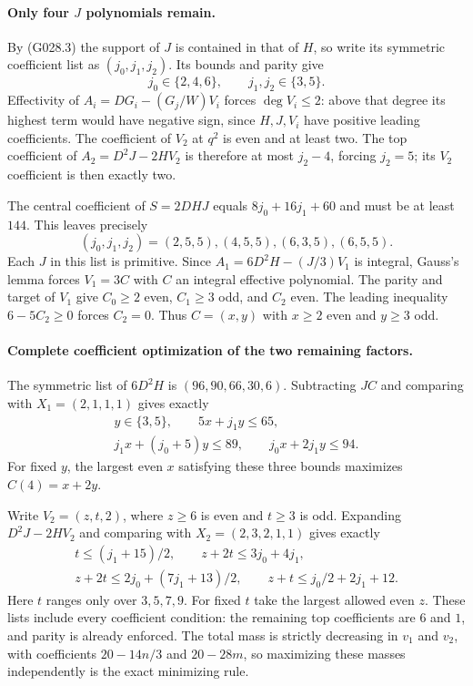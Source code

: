 \paragraph{Only four $J$ polynomials remain.}
By (G028.3) the support of $J$ is contained in that
of $H$, so write its symmetric coefficient list as
$(j_0,j_1,j_2)$. Its bounds and parity give
\[
 j_0\in\{2,4,6\},\qquad j_1,j_2\in\{3,5\}.
\]
Effectivity of $A_i=DG_i-(G_j/W)V_i$ forces
$\deg V_i\le2$: above that degree its highest term
would have negative sign, since $H,J,V_i$ have
positive leading coefficients. The coefficient of
$V_2$ at $q^2$ is even and at least two. The top
coefficient of $A_2=D^2J-2HV_2$ is therefore at most
$j_2-4$, forcing $j_2=5$; its $V_2$ coefficient is
then exactly two.

The central coefficient of $S=2DHJ$ equals
$8j_0+16j_1+60$ and must be at least $144$.
This leaves precisely
\[
 (j_0,j_1,j_2)=(2,5,5),(4,5,5),(6,3,5),(6,5,5).
 \tag{G028.8}
\]
Each $J$ in this list is primitive. Since
$A_1=6D^2H-(J/3)V_1$ is integral, Gauss's lemma
forces $V_1=3C$ with $C$ an integral effective
polynomial. The parity and target of $V_1$ give
$C_0\ge2$ even, $C_1\ge3$ odd, and $C_2$ even.
The leading inequality $6-5C_2\ge0$ forces
$C_2=0$. Thus $C=(x,y)$ with $x\ge2$ even and
$y\ge3$ odd.

\paragraph{Complete coefficient optimization of the two remaining factors.}
The symmetric list of $6D^2H$ is
$(96,90,66,30,6)$. Subtracting $JC$ and comparing
with $X_1=(2,1,1,1)$ gives exactly
\[
 \begin{gathered}
 y\in\{3,5\},\qquad
 5x+j_1y\le65,\\
 j_1x+(j_0+5)y\le89,\qquad
 j_0x+2j_1y\le94.                                  \end{gathered}\tag{G028.9}
\]
For fixed $y$, the largest even $x$ satisfying these
three bounds maximizes $C(4)=x+2y$.

Write $V_2=(z,t,2)$, where $z\ge6$ is even and
$t\ge3$ is odd. Expanding $D^2J-2HV_2$ and comparing
with $X_2=(2,3,2,1,1)$ gives exactly
\[
 \begin{gathered}
 t\le(j_1+15)/2,\qquad
 z+2t\le3j_0+4j_1,\\
 z+2t\le2j_0+(7j_1+13)/2,\qquad
 z+t\le j_0/2+2j_1+12.                             \end{gathered}\tag{G028.10}
\]
Here $t$ ranges only over $3,5,7,9$. For fixed $t$
take the largest allowed even $z$. These lists
include every coefficient condition: the remaining
top coefficients are $6$ and $1$, and parity is
already enforced. The total mass is strictly decreasing
in $v_1$ and $v_2$, with coefficients
$20-14n/3$ and $20-28m$, so maximizing these masses
independently is the exact minimizing rule.

